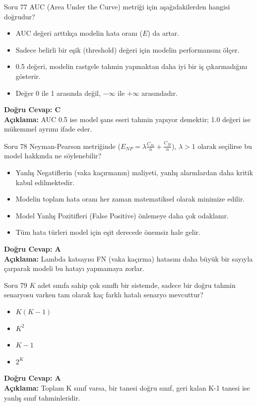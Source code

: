 \documentclass[12pt,a4paper]{article}
\begin{document}
\begin{testcard}{Soru 77}
    AUC (Area Under the Curve) metriği için aşağıdakilerden hangisi doğrudur?
    \begin{itemize}
        \item[A)] AUC değeri arttıkça modelin hata oranı ($E$) da artar.
        \item[B)] Sadece belirli bir eşik (threshold) değeri için modelin performansını ölçer.
        \item[C)] 0.5 değeri, modelin rastgele tahmin yapmaktan daha iyi bir iş çıkarmadığını gösterir.
        \item[D)] Değer 0 ile 1 arasında değil, $-\infty$ ile $+\infty$ arasındadır.
    \end{itemize}
    \tcblower
    \textbf{Doğru Cevap: C} \\
    \textbf{Açıklama:} AUC 0.5 ise model şans eseri tahmin yapıyor demektir; 1.0 değeri ise mükemmel ayrımı ifade eder.
\end{testcard}

\begin{testcard}{Soru 78}
    Neyman-Pearson metriğinde ($E_{NP} = \lambda \frac{C_{fn}}{n} + \frac{C_{fp}}{n}$), $\lambda > 1$ olarak seçilirse bu model hakkında ne söylenebilir?
    \begin{itemize}
        \item[A)] Yanlış Negatiflerin (vaka kaçırmanın) maliyeti, yanlış alarmlardan daha kritik kabul edilmektedir.
        \item[B)] Modelin toplam hata oranı her zaman matematiksel olarak minimize edilir.
        \item[C)] Model Yanlış Pozitifleri (False Positive) önlemeye daha çok odaklanır.
        \item[D)] Tüm hata türleri model için eşit derecede önemsiz hale gelir.
    \end{itemize}
    \tcblower
    \textbf{Doğru Cevap: A} \\
    \textbf{Açıklama:} Lambda katsayısı FN (vaka kaçırma) hatasını daha büyük bir sayıyla çarparak modeli bu hatayı yapmamaya zorlar.
\end{testcard}

\begin{testcard}{Soru 79}
    $K$ adet sınıfa sahip çok sınıflı bir sistemde, sadece bir doğru tahmin senaryosu varken tam olarak kaç farklı hatalı senaryo mevcuttur?
    \begin{itemize}
        \item[A)] $K(K-1)$
        \item[B)] $K^2$
        \item[C)] $K-1$
        \item[D)] $2^K$
    \end{itemize}
    \tcblower
    \textbf{Doğru Cevap: A} \\
    \textbf{Açıklama:} Toplam K sınıf varsa, bir tanesi doğru sınıf, geri kalan K-1 tanesi ise yanlış sınıf tahminleridir.
\end{testcard}
\end{document}
